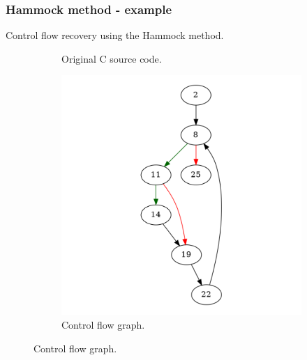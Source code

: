 \documentclass[aspectratio=1610]{beamer}
\begin{document}
\begin{frame}
	\frametitle{Hammock method - example}
	Control flow recovery using the Hammock method.
	\begin{figure}[htbp]
		\centering
		\begin{subfigure}[b]{0.30\textwidth}
			\centering
			
			\caption{Original C source code.}
		\end{subfigure}
		\begin{subfigure}[b]{0.50\textwidth}
			\centering
			\includegraphics[height=0.6\paperheight]{inc/methods/hammock/example/without-break/main.png}
			\caption{Control flow graph.}
		\end{subfigure}
	\end{figure}
\end{frame}
\end{document}
